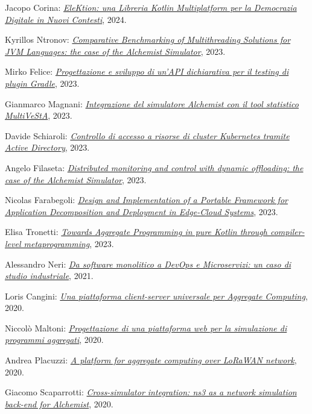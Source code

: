 \begin{innerlist}
    \item Jacopo Corina: \href{https://amslaurea.unibo.it/31132/}{\textit{EleKtion: una Libreria Kotlin Multiplatform per la Democrazia Digitale in Nuovi Contesti}}, 2024.
    \item Kyrillos Ntronov: \href{https://amslaurea.unibo.it/29647/}{\textit{Comparative Benchmarking of Multithreading Solutions for JVM Languages: the case of the Alchemist Simulator}}, 2023.
    \item Mirko Felice: \href{https://amslaurea.unibo.it/29136/}{\textit{Progettazione e sviluppo di un'API dichiarativa per il testing di plugin Gradle}}, 2023.
    \item Gianmarco Magnani: \href{https://amslaurea.unibo.it/28184/}{\textit{Integrazione del simulatore Alchemist con il tool statistico MultiVeStA}}, 2023.
    \item Davide Schiaroli: \href{https://amslaurea.unibo.it/28132/}{\textit{Controllo di accesso a risorse di cluster Kubernetes tramite Active Directory}}, 2023.
    \item Angelo Filaseta: \href{https://amslaurea.unibo.it/28111/}{\textit{Distributed monitoring and control with dynamic offloading: the case of the Alchemist Simulator}}, 2023.
    \item Nicolas Farabegoli: \href{https://amslaurea.unibo.it/28035/}{\textit{Design and Implementation of a Portable Framework for Application Decomposition and Deployment in Edge-Cloud Systems}}, 2023.
    \item Elisa Tronetti: \href{https://amslaurea.unibo.it/28077/}{\textit{Towards Aggregate Programming in pure Kotlin through compiler-level metaprogramming}}, 2023.
    \item Alessandro Neri: \href{http://amslaurea.unibo.it/23043/}{\textit{Da software monolitico a DevOps e Microservizi: un caso di studio industriale}}, 2021.
    \item Loris Cangini: \href{http://amslaurea.unibo.it/20410/}{\textit{Una piattaforma client-server universale per Aggregate Computing}}, 2020.
    \item Niccolò Maltoni: \href{http://amslaurea.unibo.it/20478/}{\textit{Progettazione di una piattaforma web per la simulazione di programmi aggregati}}, 2020.
    \item Andrea Placuzzi: \href{http://amslaurea.unibo.it/20484/}{\textit{A platform for aggregate computing over LoRaWAN network}}, 2020.
    \item Giacomo Scaparrotti: \href{http://amslaurea.unibo.it/20440/}{\textit{Cross-simulator integration: ns3 as a network simulation back-end for Alchemist}}, 2020.

\end{innerlist}
